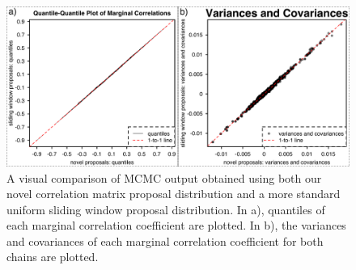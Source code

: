 \documentclass[10pt]{article}
\begin{document}
\begin{figure}[h]
\centering
\includegraphics[width=160mm]{figures/app_corrs_2methods.pdf}
\caption[Sampling from the Posterior with a Novel Proposal Distribution]{A visual comparison of MCMC output obtained using both our novel correlation matrix proposal distribution and a more standard uniform sliding window proposal distribution. In a), quantiles of each marginal correlation coefficient are plotted. In b), the variances and covariances of each marginal correlation coefficient for both chains are plotted.
\label{fig:posteriorSamplingResults} 
\label{overflow}}
\end{figure}
\end{document}
